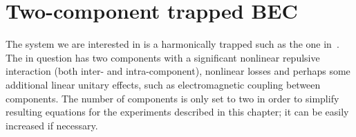 \section{Two-component trapped BEC}

The system we are interested in is a harmonically trapped  such as the one in~\cite{Riedel2010,Egorov2011,Egorov2013}.
The  in question has two components with a significant nonlinear repulsive interaction (both inter- and intra-component), nonlinear losses and perhaps some additional linear unitary effects, such as electromagnetic coupling between components.
The number of components is only set to two in order to simplify resulting equations for the experiments described in this chapter; it can be easily increased if necessary.



